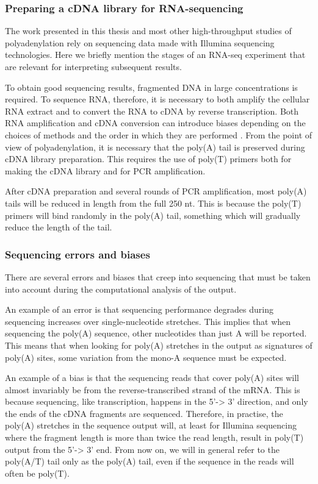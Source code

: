 \subsubsection{Preparing a cDNA library for RNA-sequencing}
The work presented in this thesis and most other high-throughput studies of
polyadenylation rely on sequencing data made with Illumina sequencing
technologies. Here we briefly mention the stages of an RNA-seq
experiment that are relevant for interpreting subsequent results.

To obtain good sequencing results, fragmented DNA in large concentrations is
required. To sequence RNA, therefore, it is necessary to both amplify the
cellular RNA extract and to convert the RNA to cDNA by reverse transcription.
Both RNA amplification and cDNA conversion can introduce biases depending on
the choices of methods and the order in which they are performed
\cite{wang_rna-seq:_2009}. From the point of view of polyadenylation, it is
necessary that the poly(A) tail is preserved during cDNA library preparation.
This requires the use of poly(T) primers both for making the cDNA library and
for PCR amplification.

After cDNA preparation and several rounds of PCR amplification, most poly(A)
tails will be reduced in length from the full 250 nt. This is because the
poly(T) primers will bind randomly in the poly(A) tail, something which will
gradually reduce the length of the tail.

\subsubsection{Sequencing errors and biases}
There are several errors and biases that creep into sequencing that must be
taken into account during the computational analysis of the output.

An example of an error is that sequencing performance degrades during
sequencing increases over single-nucleotide stretches. This implies that when
sequencing the poly(A) sequence, other nucleotides than just A will be
reported. This means that when looking for poly(A) stretches in the output as
signatures of poly(A) sites, some variation from the mono-A sequence must be
expected.

An example of a bias is that the sequencing reads that cover poly(A) sites will
almost invariably be from the reverse-transcribed strand of the mRNA. This is
because sequencing, like transcription, happens in the 5'-> 3' direction, and
only the ends of the cDNA fragments are sequenced. Therefore, in practise, the
poly(A) stretches in the sequence output will, at least for Illumina sequencing
where the fragment length is more than twice the read length, result in
poly(T) output from the 5'-> 3' end. From now on, we will in general refer to
the poly(A/T) tail only as the poly(A) tail, even if the sequence in the reads
will often be poly(T).




